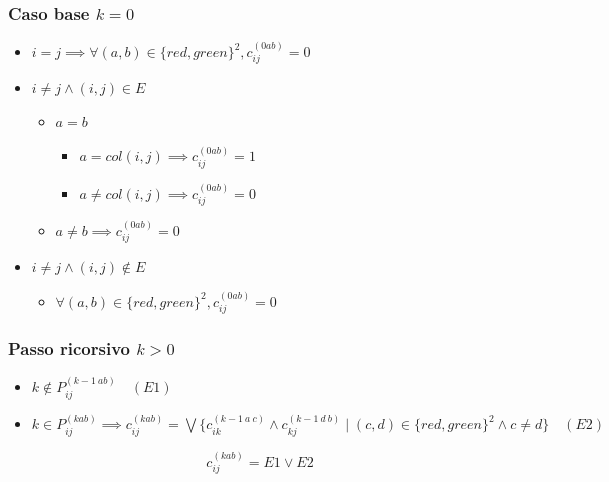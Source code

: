 \subsubsection{Caso base $k=0$}
\begin{itemize}
    \item $i=j \implies \forall(a,b) \in \{red, green\}^2, c_{ij}^{(0ab)} = 0$
    \item $i \not = j \land (i,j) \in E$
    \begin{itemize}
        \item $a=b$
        \begin{itemize}
            \item $a = col(i,j) \implies c_{ij}^{(0ab)} = 1$
            \item $a \not = col(i,j) \implies c_{ij}^{(0ab)} = 0$
        \end{itemize}
        \item $a \not = b \implies c_{ij}^{(0ab)} = 0$
    \end{itemize}

    \item $i \not = j \land (i,j) \not \in E$
    \begin{itemize}
        \item $\forall (a,b) \in \{red, green\}^2, c_{ij}^{(0ab)} = 0$
    \end{itemize}
\end{itemize}

\subsubsection{Passo ricorsivo $k>0$}
\begin{itemize}
    \item $k \not \in P_{ij}^{(k-1\ ab)} \quad (E1)$
    \item $k \in P_{ij}^{(kab)} \implies c_{ij}^{(k a b)} = \bigvee \{ c_{ik}^{(k-1\ a\ c)} \wedge c_{kj}^{(k-1\ d\ b)} \mid (c, d) \in \{red, green\}^2 \wedge c \neq d \} \quad (E2)$
\end{itemize}

{

    $$
    c_{ij}^{(kab)} = E1 \lor E2
    $$
}